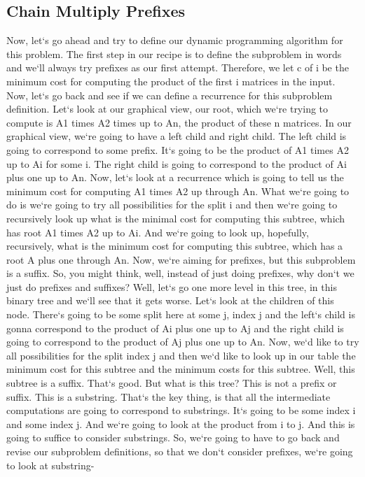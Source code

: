 \subsection{Chain Multiply  Prefixes}
Now, let`s go ahead and try to define our dynamic programming algorithm for this problem.
The first step in our recipe is to define the subproblem in words and we`ll always try prefixes as our first attempt.
Therefore, we let c of i be the minimum cost for computing the product of the first i matrices in the input.
Now, let`s go back and see if we can define a recurrence for this subproblem definition.
Let`s look at our graphical view, our root, which we`re trying to compute is A1 times A2 times up to An, the product of these n matrices.
In our graphical view, we`re going to have a left child and right child.
The left child is going to correspond to some prefix.
It`s going to be the product of A1 times A2 up to Ai for some i.
The right child is going to correspond to the product of Ai plus one up to An.
Now, let`s look at a recurrence which is going to tell us the minimum cost for computing A1 times A2 up through An.
What we`re going to do is we`re going to try all possibilities for the split i and then we`re going to recursively look up what is the minimal cost for computing this subtree, which has root A1 times A2 up to Ai.
And we`re going to look up, hopefully, recursively, what is the minimum cost for computing this subtree, which has a root A plus one through An.
Now, we`re aiming for prefixes, but this subproblem is a suffix.
So, you might think, well, instead of just doing prefixes, why don`t we just do prefixes and suffixes? Well, let`s go one more level in this tree, in this binary tree and we`ll see that it gets worse.
Let`s look at the children of this node.
There`s going to be some split here at some j, index j and the left`s child is gonna correspond to the product of Ai plus one up to Aj and the right child is going to correspond to the product of Aj plus one up to An.
Now, we`d like to try all possibilities for the split index j and then we`d like to look up in our table the minimum cost for this subtree and the minimum costs for this subtree.
Well, this subtree is a suffix.
That`s good.
But what is this tree? This is not a prefix or suffix.
This is a substring.
That`s the key thing, is that all the intermediate computations are going to correspond to substrings.
It`s going to be some index i and some index j.
And we`re going to look at the product from i to j.
And this is going to suffice to consider substrings.
So, we`re going to have to go back and revise our subproblem definitions, so that we don`t consider prefixes, we`re going to look at substring-


